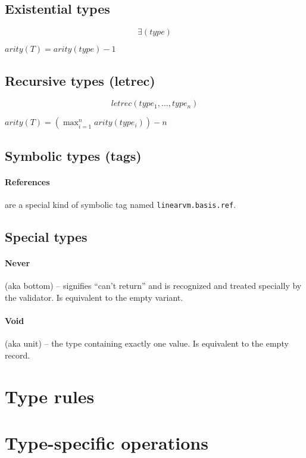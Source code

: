 \documentclass[a4paper]{report}
\begin{document}
\subsection{Existential types}
$$ \mathit{\exists(type)} $$

$\mathit{arity}(T) = \mathit{arity}(type) - 1$

\subsection{Recursive types (letrec)}
$$ \mathit{letrec(type_1, \ldots, type_n)} $$

$\mathit{arity}(T) = (\max_{i=1}^{n}{arity(type_i)}) - n$

\subsection{Symbolic types (tags)}

\paragraph{References} are a special kind of symbolic tag
named \texttt{linearvm.basis.ref}.


\subsection{Special types}

\paragraph{Never} (aka bottom) -- signifies ``can't return'' and is
recognized and treated specially by the validator.
Is equivalent to the empty variant.

\paragraph{Void} (aka unit) -- the type containing exactly one value.
Is equivalent to the empty record.

\section{Type rules}

\section{Type-specific operations}
\end{document}
